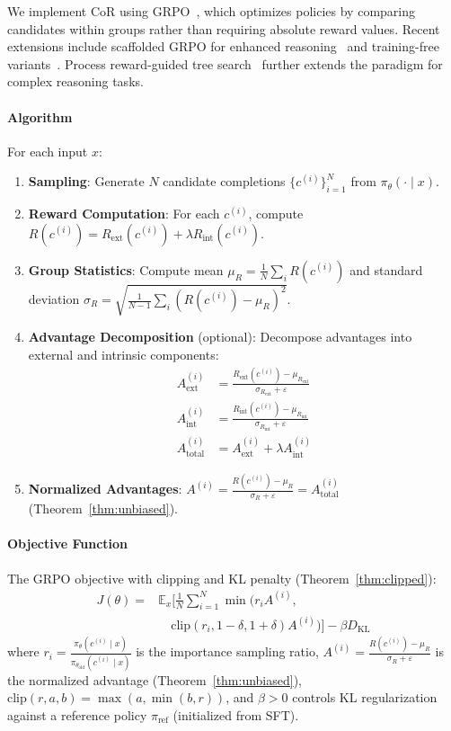 \documentclass{article}
\theoremstyle{plain}
\theoremstyle{definition}
\theoremstyle{remark}
\begin{document}
We implement CoR using GRPO~\citep{shao2024deepseekmath}, which optimizes policies by comparing candidates within groups rather than requiring absolute reward values. Recent extensions include scaffolded GRPO for enhanced reasoning~\citep{zhang2025scafgrpo} and training-free variants~\citep{cai2025trainingfree_grpo}. Process reward-guided tree search~\citep{park2025tree_search} further extends the paradigm for complex reasoning tasks.

\paragraph{Algorithm} For each input $x$:
\begin{enumerate}
\item \textbf{Sampling}: Generate $N$ candidate completions $\{c^{(i)}\}_{i=1}^{N}$ from $\pi_\theta(\cdot \mid x)$.
\item \textbf{Reward Computation}: For each $c^{(i)}$, compute $R(c^{(i)}) = R_{\text{ext}}(c^{(i)}) + \lambda R_{\text{int}}(c^{(i)})$.
\item \textbf{Group Statistics}: Compute mean $\mu_R = \frac{1}{N} \sum_i R(c^{(i)})$ and standard deviation $\sigma_R = \sqrt{\frac{1}{N-1} \sum_i (R(c^{(i)}) - \mu_R)^2}$.
\item \textbf{Advantage Decomposition} (optional): Decompose advantages into external and intrinsic components:
\begin{align}
A^{(i)}_{\text{ext}} &= \frac{R_{\text{ext}}(c^{(i)}) - \mu_{R_{\text{ext}}}}{\sigma_{R_{\text{ext}}} + \varepsilon} \\
A^{(i)}_{\text{int}} &= \frac{R_{\text{int}}(c^{(i)}) - \mu_{R_{\text{int}}}}{\sigma_{R_{\text{int}}} + \varepsilon} \\
A^{(i)}_{\text{total}} &= A^{(i)}_{\text{ext}} + \lambda A^{(i)}_{\text{int}}
\end{align}
\item \textbf{Normalized Advantages}: $A^{(i)} = \frac{R(c^{(i)}) - \mu_R}{\sigma_R + \varepsilon} = A^{(i)}_{\text{total}}$ (Theorem~\ref{thm:unbiased}).
\end{enumerate}

\paragraph{Objective Function} The GRPO objective with clipping and KL penalty (Theorem~\ref{thm:clipped}):
\begin{align}
J(\theta) ={}& \mathbb{E}_{x} \Big[ \frac{1}{N} \sum_{i=1}^{N} \min\big( r_i A^{(i)}, \nonumber \\
& \quad \text{clip}(r_i, 1{-}\delta, 1{+}\delta) A^{(i)} \big) \Big] - \beta D_{\text{KL}}
\end{align}
where $r_i = \frac{\pi_\theta(c^{(i)} \mid x)}{\pi_{\theta_{\text{old}}}(c^{(i)} \mid x)}$ is the importance sampling ratio, $A^{(i)} = \frac{R(c^{(i)}) - \mu_R}{\sigma_R + \varepsilon}$ is the normalized advantage (Theorem~\ref{thm:unbiased}), $\text{clip}(r, a, b) = \max(a, \min(b, r))$, and $\beta > 0$ controls KL regularization against a reference policy $\pi_{\text{ref}}$ (initialized from SFT).
\end{document}
